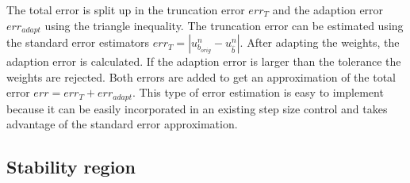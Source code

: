 \documentclass[a4paper]{article}
\numberwithin{equation}{section}
\theoremstyle{plain}
\theoremstyle{definition}
\numberwithin{theorem}{section}
\newcommand{\1}{\mathbbm{1}}
\begin{document}
The total error is split up in the truncation error $err_T$ and the adaption error $err_{adapt}$ using the triangle inequality. 
The truncation error can be estimated using the standard error estimators $err_T = | u^{n}_{b_{orig}} - u^{n}_{\hat{b}} |$. 
After adapting the weights, the adaption error is calculated. If the adaption error is larger than the tolerance the weights are rejected.
Both errors are added to get an approximation of the total error $err = err_T + err_{adapt}$.
This type of error estimation is easy to implement because it can be easily incorporated in an existing step size control and takes advantage of the standard error approximation.


\subsection{Stability region}
\end{document}
